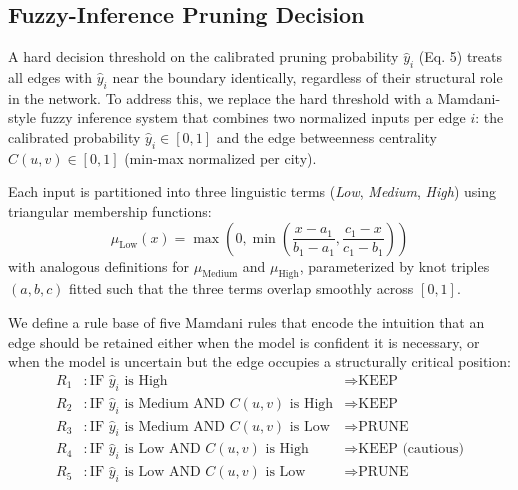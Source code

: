\subsection{Fuzzy-Inference Pruning Decision}
\label{sec:fuzzy}

A hard decision threshold on the calibrated pruning probability $\hat{y}_i$ (Eq. 5) treats all edges with $\hat{y}_i$ near the boundary identically, regardless of their structural role in the network. To address this, we replace the hard threshold with a Mamdani-style fuzzy inference system that combines two normalized inputs per edge $i$: the calibrated probability $\hat{y}_i \in [0,1]$ and the edge betweenness centrality $C(u,v) \in [0,1]$ (min-max normalized per city).

Each input is partitioned into three linguistic terms (\textit{Low}, \textit{Medium}, \textit{High}) using triangular membership functions:
\begin{equation}
    \mu_{\text{Low}}(x) = \max\left(0, \min\left(\frac{x - a_1}{b_1 - a_1}, \frac{c_1 - x}{c_1 - b_1}\right)\right)
\end{equation}
with analogous definitions for $\mu_{\text{Medium}}$ and $\mu_{\text{High}}$, parameterized by knot triples $(a,b,c)$ fitted such that the three terms overlap smoothly across $[0,1]$.

We define a rule base of five Mamdani rules that encode the intuition that an edge should be retained either when the model is confident it is necessary, or when the model is uncertain but the edge occupies a structurally critical position:
\begin{align}
    R_1&: \text{IF } \hat{y}_i \text{ is High} &\Rightarrow \text{KEEP} \\
    R_2&: \text{IF } \hat{y}_i \text{ is Medium AND } C(u,v) \text{ is High} &\Rightarrow \text{KEEP} \\
    R_3&: \text{IF } \hat{y}_i \text{ is Medium AND } C(u,v) \text{ is Low} &\Rightarrow \text{PRUNE} \\
    R_4&: \text{IF } \hat{y}_i \text{ is Low AND } C(u,v) \text{ is High} &\Rightarrow \text{KEEP (cautious)} \\
    R_5&: \text{IF } \hat{y}_i \text{ is Low AND } C(u,v) \text{ is Low} &\Rightarrow \text{PRUNE}
\end{align}

